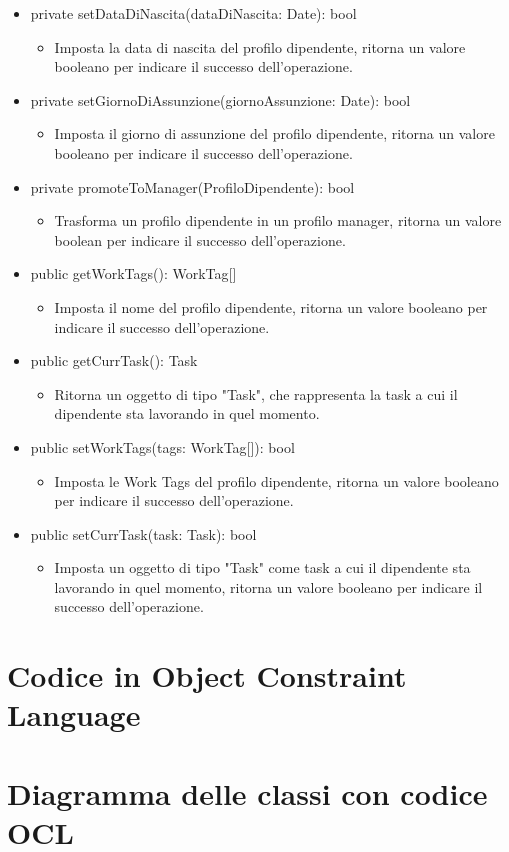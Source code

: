 \documentclass{report}
\begin{document}
\begin{itemize}
\item private  setDataDiNascita(dataDiNascita: Date): bool
\begin{itemize}
    \item Imposta la data di nascita del profilo dipendente, ritorna un valore booleano per indicare il successo dell'operazione.
\end{itemize}
\item private setGiornoDiAssunzione(giornoAssunzione: Date): bool
\begin{itemize}
    \item Imposta il giorno di assunzione del profilo dipendente, ritorna un valore booleano per indicare il successo dell'operazione.
\end{itemize}
\item private promoteToManager(ProfiloDipendente): bool
\begin{itemize}
    \item Trasforma un profilo dipendente in un profilo manager, ritorna un valore boolean per indicare il successo dell'operazione.
\end{itemize}
\item public getWorkTags(): WorkTag[]
\begin{itemize}
    \item Imposta il nome del profilo dipendente, ritorna un valore booleano per indicare il successo dell'operazione.
\end{itemize}
\item public getCurrTask(): Task
\begin{itemize}
    \item Ritorna un oggetto di tipo "Task", che rappresenta la task a cui il dipendente sta lavorando in quel momento.
\end{itemize}
\item public setWorkTags(tags: WorkTag[]): bool
\begin{itemize}
    \item Imposta le Work Tags del profilo dipendente, ritorna un valore booleano per indicare il successo dell'operazione.
\end{itemize}
\item public setCurrTask(task: Task): bool
\begin{itemize}
    \item Imposta un oggetto di tipo "Task" come task a cui il dipendente sta lavorando in quel momento, ritorna un valore booleano per indicare il successo dell'operazione.
\end{itemize}
\end{itemize}











\chapter{Codice in Object Constraint Language}	
	
\chapter{Diagramma delle classi con codice OCL}
	
\end{document}
